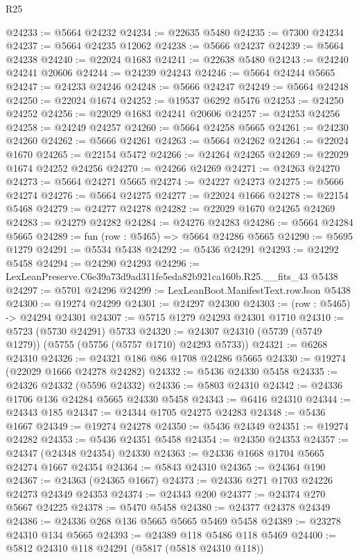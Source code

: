 \begin{lexlean}{R25}
\begin{coremodule}
@24233 := @5664 @24232
@24234 := @22635 @5480
@24235 := @7300 @24234
@24237 := @5664 @24235 @12062
@24238 := @5666 @24237
@24239 := @5664 @24238
@24240 := @22024 @1683
@24241 := @22638 @5480
@24243 := @24240 @24241 @20606
@24244 := @24239 @24243
@24246 := @5664 @24244 @5665
@24247 := @24233 @24246
@24248 := @5666 @24247
@24249 := @5664 @24248
@24250 := @22024 @1674
@24252 := @19537 @6292 @5476
@24253 := @24250 @24252
@24256 := @22029 @1683 @24241 @20606
@24257 := @24253 @24256
@24258 := @24249 @24257
@24260 := @5664 @24258 @5665
@24261 := @24230 @24260
@24262 := @5666 @24261
@24263 := @5664 @24262
@24264 := @22024 @1670
@24265 := @22154 @5472
@24266 := @24264 @24265
@24269 := @22029 @1674 @24252 @24256
@24270 := @24266 @24269
@24271 := @24263 @24270
@24273 := @5664 @24271 @5665
@24274 := @24227 @24273
@24275 := @5666 @24274
@24276 := @5664 @24275
@24277 := @22024 @1666
@24278 := @22154 @5468
@24279 := @24277 @24278
@24282 := @22029 @1670 @24265 @24269
@24283 := @24279 @24282
@24284 := @24276 @24283
@24286 := @5664 @24284 @5665
@24289 := fun (row : @5465) => @5664 @24286 @5665
@24290 := @5695 @1279
@24291 := @5534 @5438
@24292 := @5436 @24291
@24293 := @24292 @5458
@24294 := @24290 @24293
@24296 := LexLeanPreserve.C6e39a73d9ad311fe5eda82b921ca160b.R25.__fits_43 @5438
@24297 := @5701 @24296
@24299 := LexLeanBoot.ManifestText.rowJson @5438
@24300 := @19274 @24299
@24301 := @24297 @24300
@24303 := (row : @5465) -> @24294 @24301
@24307 := @5715 @1279 @24293 @24301 @1710
@24310 := @5723 (@5730 @24291) @5733
@24320 := @24307 @24310 (@5739 (@5749 @1279)) (@5755 (@5756 (@5757 @1710) @24293 @5733))
@24321 := @6268 @24310
@24326 := @24321 @186 @86 @1708 @24286 @5665
@24330 := @19274 (@22029 @1666 @24278 @24282)
@24332 := @5436 @24330 @5458
@24335 := @24326 @24332 (@5596 @24332)
@24336 := @5803 @24310
@24342 := @24336 @1706 @136 @24284 @5665 @24330 @5458
@24343 := @6416 @24310
@24344 := @24343 @185
@24347 := @24344 @1705 @24275 @24283
@24348 := @5436 @1667
@24349 := @19274 @24278
@24350 := @5436 @24349
@24351 := @19274 @24282
@24353 := @5436 @24351 @5458
@24354 := @24350 @24353
@24357 := @24347 (@24348 @24354) @24330
@24363 := @24336 @1668 @1704 @5665 @24274 @1667 @24354
@24364 := @5843 @24310
@24365 := @24364 @190
@24367 := @24363 (@24365 @1667)
@24373 := @24336 @271 @1703 @24226 @24273 @24349 @24353
@24374 := @24343 @200
@24377 := @24374 @270 @5667 @24225
@24378 := @5470 @5458
@24380 := @24377 @24378 @24349
@24386 := @24336 @268 @136 @5665 @5665 @5469 @5458
@24389 := @23278 @24310 @134 @5665
@24393 := @24389 @118 @5486 @118 @5469
@24400 := @5812 @24310 @118 @24291 (@5817 (@5818 @24310 @118))

\end{coremodule}
\end{lexlean}

